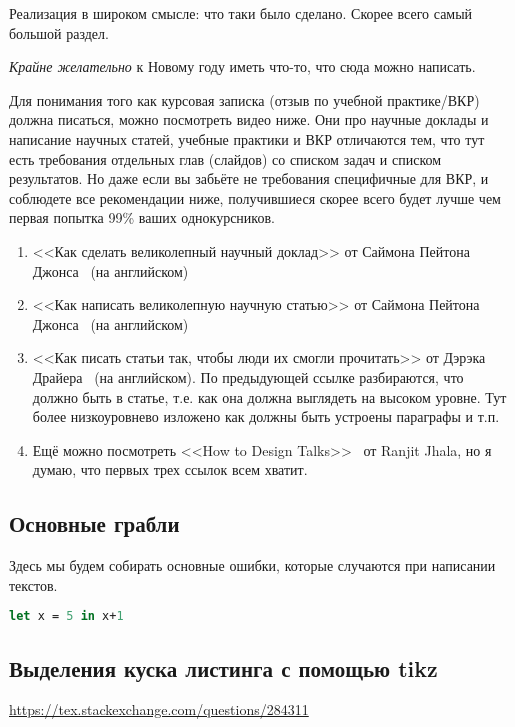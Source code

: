 
Реализация в широком смысле: что таки было сделано. Скорее всего самый большой раздел.

\emph{Крайне желательно} к Новому году иметь что-то, что сюда можно написать.

Для понимания того как курсовая записка (отзыв по учебной практике/ВКР) должна писаться, можно посмотреть видео ниже. Они про научные доклады и написание научных статей, учебные практики и ВКР отличаются тем, что тут есть требования отдельных глав (слайдов) со списком задач и списком результатов. Но даже если вы забьёте не требования специфичные для ВКР, и соблюдете все рекомендации ниже, получившиеся скорее всего будет лучше чем первая попытка 99\% ваших однокурсников.

\begin{enumerate}
\item <<Как сделать великолепный научный доклад>> от Саймона Пейтона Джонса~\cite{SPJGreatTalk} (на английском)
\item <<Как написать великолепную научную статью>> от Саймона Пейтона Джонса~\cite{SPJGreatPaper} (на английском)
\item <<Как писать статьи так, чтобы люди их смогли прочитать>> от Дэрэка Драйера~\cite{DreyerYoutube2020} (на английском). По предыдующей ссылке разбираются, что должно быть в статье, т.е. как она должна выглядеть на высоком уровне. Тут более низкоуровнево изложено как должны быть устроены параграфы и т.п.
\item Ещё можно посмотреть <<How to Design Talks>>~\cite{JhalaYoutube2020} от Ranjit Jhala, но я думаю, что первых трех ссылок всем хватит.
\end{enumerate}


\subsection{Основные грабли}
Здесь мы будем собирать основные ошибки, которые случаются при написании текстов.


\begin{lstlisting}[caption=Название обязательно, language=Caml, frame=single]
let x = 5 in x+1
\end{lstlisting}

\subsection{Выделения куска листинга с помощью tikz}
\url{https://tex.stackexchange.com/questions/284311}

